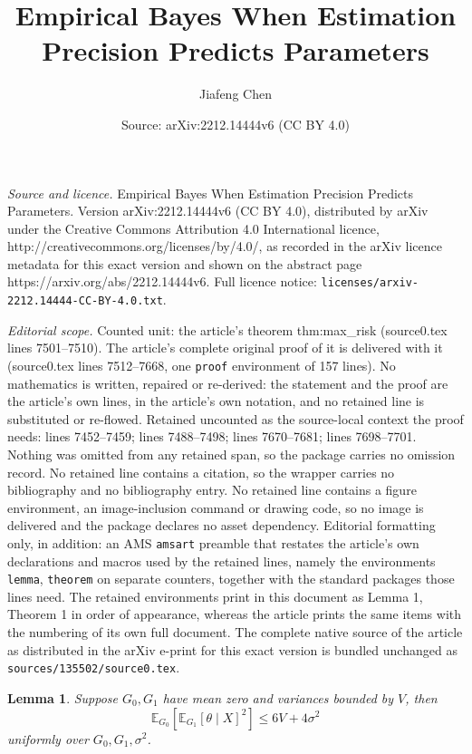 \documentclass[10pt,a4paper]{amsart}
\title{Empirical Bayes When Estimation Precision Predicts Parameters}
\author{Jiafeng Chen}
\date{Source: arXiv:2212.14444v6 (CC BY 4.0)}
\newtheorem{lemma}{Lemma}
\newcommand{\E}{\mathbb{E}}
\begin{document}
\maketitle

\noindent\emph{Source and licence.} Empirical Bayes When Estimation Precision Predicts Parameters. Version arXiv:2212.14444v6 (CC BY 4.0), distributed by arXiv under the Creative Commons Attribution 4.0 International licence, http://creativecommons.org/licenses/by/4.0/, as recorded in the arXiv licence metadata for this exact version and shown on the abstract page https://arxiv.org/abs/2212.14444v6. Full licence notice: \texttt{licenses/arxiv-2212.14444-CC-BY-4.0.txt}.\par\smallskip

\noindent\textit{Editorial scope.} Counted unit: the article's theorem thm:max\_risk (source0.tex lines 7501--7510). The article's complete original proof of it is delivered with it (source0.tex lines 7512--7668, one \texttt{proof} environment of 157 lines). No mathematics is written, repaired or re-derived: the statement and the proof are the article's own lines, in the article's own notation, and no retained line is substituted or re-flowed.  Retained uncounted as the source-local context the proof needs: lines 7452--7459; lines 7488--7498; lines 7670--7681; lines 7698--7701.  Nothing was omitted from any retained span, so the package carries no omission record.  No retained line contains a citation, so the wrapper carries no bibliography and no bibliography entry.  No retained line contains a figure environment, an image-inclusion command or drawing code, so no image is delivered and the package declares no asset dependency.  Editorial formatting only, in addition: an AMS \texttt{amsart} preamble that restates the article's own declarations and macros used by the retained lines, namely the environments \texttt{lemma}, \texttt{theorem} on separate counters, together with the standard packages those lines need.  The retained environments print in this document as Lemma 1, Theorem 1 in order of appearance, whereas the article prints the same items with the numbering of its own full document.  The complete native source of the article as distributed in the arXiv e-print for this exact version is bundled unchanged as \texttt{sources/135502/source0.tex}.
\begin{lemma}
\label{lemma:bound_small_sigma}
Suppose $G_0, G_1$ have mean zero and variances bounded by $V$, then
\[
\E_{G_0}[\E_{G_1}[\theta \mid X]^2] \le 6V + 4\sigma^2
\]
uniformly over $G_0, G_1, \sigma^2$. 
\end{lemma}
\end{document}
